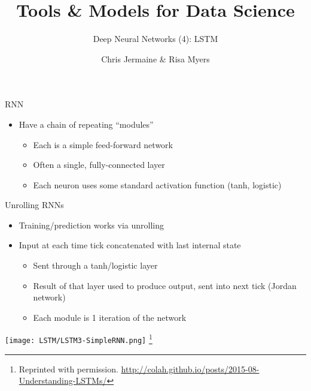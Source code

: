 \documentclass[aspectratio=169]{beamer}
\title[]
{Tools \& Models for Data Science}
\subtitle{Deep Neural Networks (4): LSTM}
\author[]{Chris Jermaine \& Risa Myers}
\institute
{
  Rice University 
}
\date[]{}
\begin{document}
\begin{frame}
 \titlepage
\end{frame}
\begin{frame}{RNN}

\begin{itemize}
	\item Have a chain of repeating ``modules'' 
	\begin{itemize}
	\item Each is a simple feed-forward network
	\item Often a single, fully-connected layer
	\item Each neuron uses some standard activation function (tanh, logistic)
	\end{itemize}
\end{itemize}
\end{frame}
\begin{frame}{Unrolling RNNs}

\begin{itemize}
	\item Training/prediction works via unrolling
	\item Input at each time tick concatenated with last internal state
\begin{itemize}
	\item Sent through a tanh/logistic layer
	\item Result of that layer used to produce output, sent into next tick (Jordan network)
	\item Each module is 1 iteration of the network
\end{itemize}
\end{itemize}
\texttt{[image: LSTM/LSTM3-SimpleRNN.png]}
\footnote{Reprinted with permission. \url{http://colah.github.io/posts/2015-08-Understanding-LSTMs/}}
\end{frame}
\end{document}
